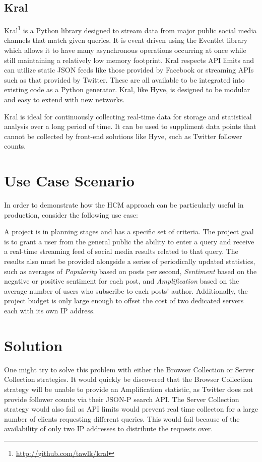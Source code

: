 \documentclass[letterpaper]{article}
\begin{document}
\subsection{Kral}

Kral\footnote{\url{http://github.com/tawlk/kral}} is a Python library designed to stream data from major public social media channels that match given queries. It is event driven using the Eventlet library which allows it to have many asynchronous operations occurring at once while still maintaining a relatively low memory footprint. Kral respects API limits and can utilize static JSON feeds like those provided by Facebook or streaming APIs such as that provided by Twitter. These are all available to be integrated into existing code as a Python generator. Kral, like Hyve, is designed to be modular and easy to extend with new networks.

Kral is ideal for continuously collecting real-time data for storage and statistical analysis over a long period of time. It can be used to suppliment data points that cannot be collected by front-end solutions like Hyve, such as Twitter follower counts.

\section{Use Case Scenario}

In order to demonstrate how the HCM approach can be particularly useful in production, consider the following use case:

A project is in planning stages and has a specific set of criteria. The project goal is to grant a user from the general public the ability to enter a query and receive a real-time streaming feed of social media results related to that query. The results also must be provided alongside a series of periodically updated statistics, such as averages of \textit{Popularity} based on posts per second, \textit{Sentiment} based on the negative or positive sentiment for each post, and \textit{Amplification} based on the average number of users who subscribe to each posts' author.  Additionally, the project budget is only large enough to offset the cost of two dedicated servers each with its own IP address.

\section{Solution}

One might try to solve this problem with either the Browser Collection or Server Collection strategies. It would quickly be discovered that the Browser Collection strategy will be unable to provide an Amplification statistic, as Twitter does not provide follower counts via their JSON-P search API. The Server Collection strategy would also fail as API limits would prevent real time collecton for a large number of clients requesting different queries. This would fail because of the availability of only two IP addresses to distribute the requests over.
\end{document}
